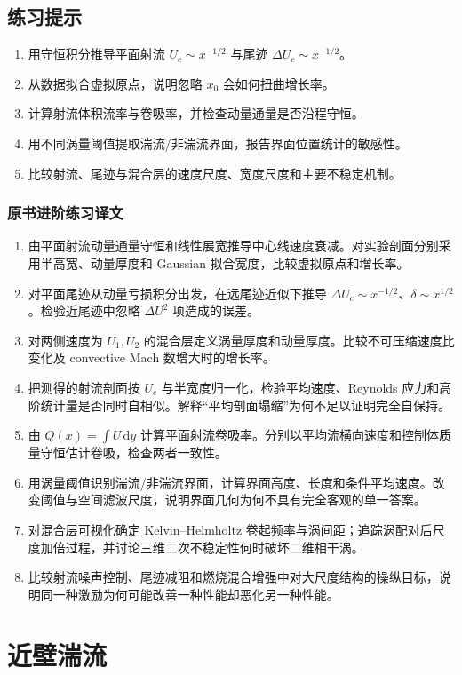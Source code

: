 \documentclass[12pt,a4paper,openany,fontset=none]{ctexbook}
\newcommand{\dd}{\,\mathrm d}
\begin{document}
\section*{练习提示}
\begin{enumerate}
 \item 用守恒积分推导平面射流 $U_c\sim x^{-1/2}$ 与尾迹 $\Delta U_c\sim x^{-1/2}$。
 \item 从数据拟合虚拟原点，说明忽略 $x_0$ 会如何扭曲增长率。
 \item 计算射流体积流率与卷吸率，并检查动量通量是否沿程守恒。
 \item 用不同涡量阈值提取湍流/非湍流界面，报告界面位置统计的敏感性。
 \item 比较射流、尾迹与混合层的速度尺度、宽度尺度和主要不稳定机制。
\end{enumerate}

\subsection*{原书进阶练习译文}
\begin{enumerate}[label=\arabic*.]
 \item 由平面射流动量通量守恒和线性展宽推导中心线速度衰减。对实验剖面分别采用半高宽、动量厚度和 Gaussian 拟合宽度，比较虚拟原点和增长率。
 \item 对平面尾迹从动量亏损积分出发，在远尾迹近似下推导 $\Delta U_c\sim x^{-1/2}$、$\delta\sim x^{1/2}$。检验近尾迹中忽略 $\Delta U^2$ 项造成的误差。
 \item 对两侧速度为 $U_1,U_2$ 的混合层定义涡量厚度和动量厚度。比较不可压缩速度比变化及 convective Mach 数增大时的增长率。
 \item 把测得的射流剖面按 $U_c$ 与半宽度归一化，检验平均速度、Reynolds 应力和高阶统计量是否同时自相似。解释“平均剖面塌缩”为何不足以证明完全自保持。
 \item 由 $Q(x)=\int U\dd y$ 计算平面射流卷吸率。分别以平均流横向速度和控制体质量守恒估计卷吸，检查两者一致性。
 \item 用涡量阈值识别湍流/非湍流界面，计算界面高度、长度和条件平均速度。改变阈值与空间滤波尺度，说明界面几何为何不具有完全客观的单一答案。
 \item 对混合层可视化确定 Kelvin--Helmholtz 卷起频率与涡间距；追踪涡配对后尺度加倍过程，并讨论三维二次不稳定性何时破坏二维相干涡。
 \item 比较射流噪声控制、尾迹减阻和燃烧混合增强中对大尺度结构的操纵目标，说明同一种激励为何可能改善一种性能却恶化另一种性能。
\end{enumerate}
\chapter{近壁湍流}
\end{document}

